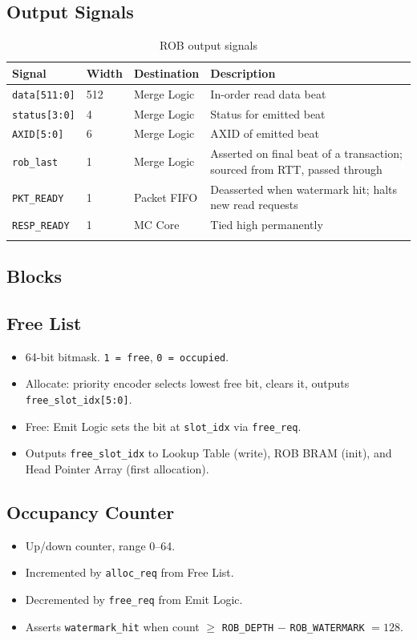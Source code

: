 \subsection*{Output Signals}
\begin{longtable}{p{3cm}p{1cm}p{3cm}p{7cm}}
\toprule
\textbf{Signal} & \textbf{Width} & \textbf{Destination} & \textbf{Description} \\
\midrule
\texttt{data[511:0]}    & 512 & Merge Logic  & In-order read data beat \\
\texttt{status[3:0]}    & 4   & Merge Logic  & Status for emitted beat \\
\texttt{AXID[5:0]}      & 6   & Merge Logic  & AXID of emitted beat \\
\texttt{rob\_last}      & 1   & Merge Logic  & Asserted on final beat of a transaction; sourced from RTT, passed through \\
\texttt{PKT\_READY}     & 1   & Packet FIFO  & Deasserted when watermark hit; halts new read requests \\
\texttt{RESP\_READY}    & 1   & MC Core      & Tied high permanently \\
\bottomrule
\caption{ROB output signals}
\end{longtable}

\subsection{Blocks}

\subsection{Free List}
\begin{itemize}[noitemsep]
  \item 64-bit bitmask. \texttt{1 = free}, \texttt{0 = occupied}.
  \item Allocate: priority encoder selects lowest free bit, clears it, outputs \texttt{free\_slot\_idx[5:0]}.
  \item Free: Emit Logic sets the bit at \texttt{slot\_idx} via \texttt{free\_req}.
  \item Outputs \texttt{free\_slot\_idx} to Lookup Table (write), ROB BRAM (init), and Head Pointer Array (first allocation).
\end{itemize}

\subsection{Occupancy Counter}
\begin{itemize}[noitemsep]
  \item Up/down counter, range 0--64.
  \item Incremented by \texttt{alloc\_req} from Free List.
  \item Decremented by \texttt{free\_req} from Emit Logic.
  \item Asserts \texttt{watermark\_hit} when count $\geq$ \texttt{ROB\_DEPTH} $-$ \texttt{ROB\_WATERMARK} $= 128$.
\end{itemize}

